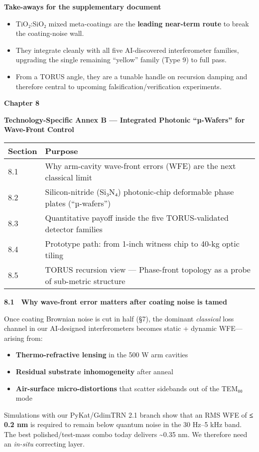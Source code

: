 \documentclass[]{article}
\begin{document}
\textbf{Take-aways for the supplementary document}

\begin{itemize}
\item
  TiO₂:SiO₂ mixed meta-coatings are the \textbf{leading near-term route}
  to break the coating-noise wall.
\item
  They integrate cleanly with all five AI-discovered interferometer
  families, upgrading the single remaining ``yellow'' family (Type 9) to
  full pass.
\item
  From a TORUS angle, they are a tunable handle on recursion damping and
  therefore central to upcoming falsification/verification experiments.
\end{itemize}

\textbf{Chapter 8}

\textbf{Technology-Specific Annex B --- Integrated Photonic ``µ-Wafers''
for Wave-Front Control}

\begin{longtable}[]{@{}ll@{}}
\toprule
\textbf{Section} & \textbf{Purpose}\tabularnewline
\midrule
\endhead
8.1 & Why arm-cavity wave-front errors (WFE) are the next classical
limit\tabularnewline
8.2 & Silicon-nitride (Si₃N₄) photonic-chip deformable phase plates
(``µ-wafers'')\tabularnewline
8.3 & Quantitative payoff inside the five TORUS-validated detector
families\tabularnewline
8.4 & Prototype path: from 1-inch witness chip to 40-kg optic
tiling\tabularnewline
8.5 & TORUS recursion view --- Phase-front topology as a probe of
sub-metric structure\tabularnewline
\bottomrule
\end{longtable}

\textbf{8.1 Why wave-front error matters after coating noise is tamed}

Once coating Brownian noise is cut in half (§7), the dominant
\emph{classical} loss channel in our AI-designed interferometers becomes
static + dynamic WFE---arising from:

\begin{itemize}
\item
  \textbf{Thermo-refractive lensing} in the 500 W arm cavities
\item
  \textbf{Residual substrate inhomogeneity} after anneal
\item
  \textbf{Air-surface micro-distortions} that scatter sidebands out of
  the TEM₀₀ mode
\end{itemize}

Simulations with our PyKat/GdimTRN 2.1 branch show that an RMS WFE of
\textbf{≤ 0.2 nm} is required to remain below quantum noise in the 30
Hz--5 kHz band. The best polished/test-mass combo today delivers
\textasciitilde{}0.35 nm. We therefore need an \emph{in-situ} correcting
layer.
\end{document}
